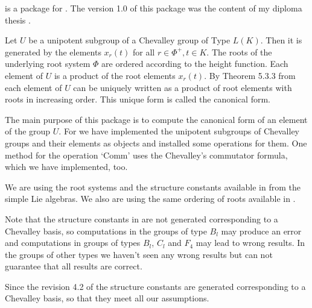

{\Unipot} is a package for {} \cite{GAP4}. The  version 1.0
of   this  package  was   the  content  of  my  diploma   thesis
\cite{SH2000}.

Let $U$ be a unipotent  subgroup of  a  Chevalley  group of Type
$L(K)$.  Then it is generated by  the  elements $x_r(t)$ for all
$r\in  \Phi^+,t\in K$. The roots of the underlying  root  system
$\Phi$  are  ordered  according  to  the height  function.  Each
element of  $U$ is  a product of the  root elements $x_r(t)$. By
Theorem 5.3.3 from  \cite{Carter72}  each element of $U$ can  be
uniquely  written  as a product  of root  elements with roots in
increasing order. This unique form is called the canonical form.


The main  purpose  of this  package is to compute the  canonical
form of an element of the group $U$. For we have implemented the
unipotent subgroups  of Chevalley groups and  their elements  as
{\GAP} objects and  installed  some  operations  for  them.  One
method for the operation `Comm'  uses the Chevalley's commutator
formula, which we have implemented, too.



We  are  using  the  root  systems and  the  structure constants
available in {\GAP} from  the simple  Lie algebras. We  also are
using the same ordering of roots available in {\GAP}.

Note that the structure constants in {} are not generated
corresponding  to  a Chevalley  basis, so  computations  in  the
groups of  type $B_l$  may produce an  error and computations in
groups  of  types  $B_l$,  $C_l$  and $F_4$ may  lead  to  wrong
results. In the groups of other types  we haven't seen any wrong
results but can not guarantee that all results are correct.

Since the revision  4.2  of  {\GAP} the  structure constants are
generated corresponding to a  Chevalley basis, so that they meet
all our assumptions.

